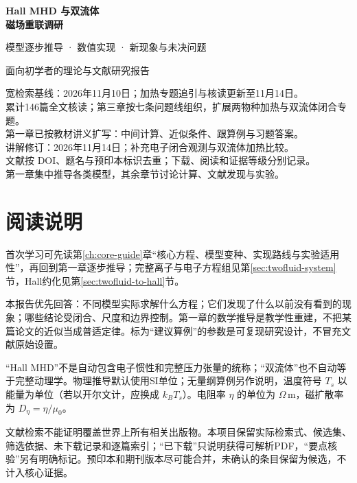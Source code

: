 \documentclass[UTF8,a4paper,11pt,openany,fontset=fandol]{ctexbook}
\begin{document}
\frontmatter
\begin{titlepage}
\vspace*{20mm}
{\sffamily\Huge\bfseries\color{ink}Hall MHD 与双流体\\[8pt]磁场重联调研\par}
\vspace{12mm}
{\sffamily\Large 模型逐步推导 · 数值实现 · 新现象与未决问题\par}
\vspace{14mm}
{\large 面向初学者的理论与文献研究报告\par}
\vfill
宽检索基线：2026年11月10日；加热专题追引与核读更新至11月14日。\\[5pt]
累计146篇全文核读；第三章按七条问题线组织，扩展两物种加热与双流体闭合专题。\\[5pt]
第一章已按教材讲义扩写：中间计算、近似条件、跟算例与习题答案。\\[5pt]
讲解修订：2026年11月14日；补充电子闭合观测与双流体加热比较。\\[5pt]
文献按 DOI、题名与预印本标识去重；下载、阅读和证据等级分别记录。\\[5pt]
第一章集中推导各类模型，其余章节讨论计算、文献发现与实验。\\[8pt]

\end{titlepage}
\chapter*{阅读说明}
首次学习可先读第\ref{ch:core-guide}章“核心方程、模型变种、实现路线与实验适用性”，再回到第一章逐步推导；完整离子与电子方程组见第\ref{sec:twofluid-system}节，Hall约化见第\ref{sec:twofluid-to-hall}节。

本报告优先回答：不同模型实际求解什么方程；它们发现了什么以前没有看到的现象；哪些结论受闭合、尺度和边界控制。第一章的数学推导是教学性重建，不把某篇论文的近似当成普适定律。标为“建议算例”的参数是可复现研究设计，不冒充文献原始设置。

“Hall MHD”不是自动包含电子惯性和完整压力张量的统称；“双流体”也不自动等于完整动理学。物理推导默认使用SI单位；无量纲算例另作说明，温度符号 $T_s$ 以能量为单位（若以开尔文计，应换成 $k_BT_s$）。电阻率 $\eta$ 的单位为 $\Omega\,\mathrm m$，磁扩散率为 $D_\eta=\eta/\mu_0$。

文献检索不能证明覆盖世界上所有相关出版物。本项目保留实际检索式、候选集、筛选依据、未下载记录和逐篇索引；“已下载”只说明获得可解析PDF，“要点核验”另有明确标记。预印本和期刊版本尽可能合并，未确认的条目保留为候选，不计入核心证据。
\end{document}
